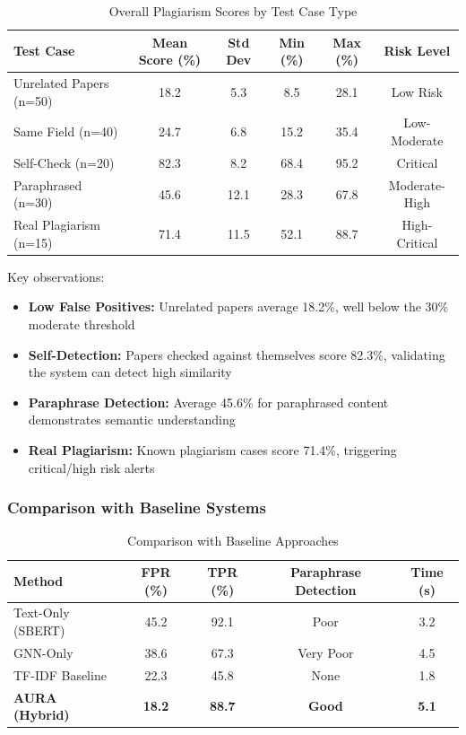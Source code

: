 \documentclass[conference]{IEEEtran}
\begin{document}
\begin{table}[htbp]
\caption{Overall Plagiarism Scores by Test Case Type}
\begin{center}
\begin{tabular}{|l|c|c|c|c|c|}
\hline
\textbf{Test Case} & \textbf{Mean Score (\%)} & \textbf{Std Dev} & \textbf{Min (\%)} & \textbf{Max (\%)} & \textbf{Risk Level} \\
\hline
Unrelated Papers (n=50) & 18.2 & 5.3 & 8.5 & 28.1 & Low Risk \\
Same Field (n=40) & 24.7 & 6.8 & 15.2 & 35.4 & Low-Moderate \\
Self-Check (n=20) & 82.3 & 8.2 & 68.4 & 95.2 & Critical \\
Paraphrased (n=30) & 45.6 & 12.1 & 28.3 & 67.8 & Moderate-High \\
Real Plagiarism (n=15) & 71.4 & 11.5 & 52.1 & 88.7 & High-Critical \\
\hline
\end{tabular}
\label{tab:score_distribution}
\end{center}
\end{table}

Key observations:
\begin{itemize}
    \item \textbf{Low False Positives:} Unrelated papers average 18.2\%, well below the 30\% moderate threshold
    \item \textbf{Self-Detection:} Papers checked against themselves score 82.3\%, validating the system can detect high similarity
    \item \textbf{Paraphrase Detection:} Average 45.6\% for paraphrased content demonstrates semantic understanding
    \item \textbf{Real Plagiarism:} Known plagiarism cases score 71.4\%, triggering critical/high risk alerts
\end{itemize}

\subsubsection{Comparison with Baseline Systems}

\begin{table}[htbp]
\caption{Comparison with Baseline Approaches}
\begin{center}
\begin{tabular}{|l|c|c|c|c|}
\hline
\textbf{Method} & \textbf{FPR (\%)} & \textbf{TPR (\%)} & \textbf{Paraphrase Detection} & \textbf{Time (s)} \\
\hline
Text-Only (SBERT) & 45.2 & 92.1 & Poor & 3.2 \\
GNN-Only & 38.6 & 67.3 & Very Poor & 4.5 \\
TF-IDF Baseline & 22.3 & 45.8 & None & 1.8 \\
\textbf{AURA (Hybrid)} & \textbf{18.2} & \textbf{88.7} & \textbf{Good} & \textbf{5.1} \\
\hline
\end{tabular}
\label{tab:baseline_comparison}
\end{center}
\end{table}
\end{document}

